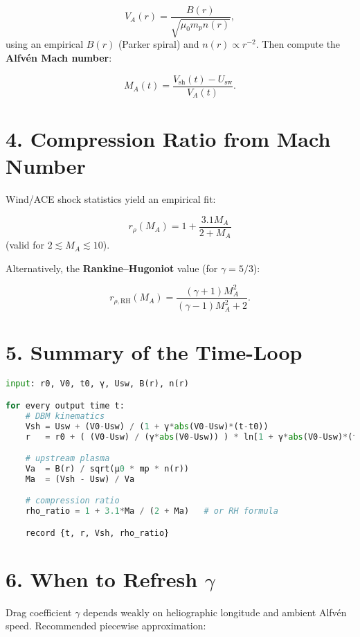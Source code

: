 \[
V_A(r) = \frac{B(r)}{\sqrt{\mu_0 m_p n(r)}},
\]
using an empirical $B(r)$ (Parker spiral) and $n(r) \propto r^{-2}$. Then compute the \textbf{Alfvén Mach number}:

\[
M_A(t) = \frac{V_{\text{sh}}(t) - U_{\text{sw}}}{V_A(t)}.
\]

\hrulefill

\section*{4. Compression Ratio from Mach Number}

Wind/ACE shock statistics yield an empirical fit:

\[
\boxed{
r_{\rho}(M_A) = 1 + \frac{3.1 M_A}{2 + M_A}
}
\]
(valid for $2 \lesssim M_A \lesssim 10$).

Alternatively, the \textbf{Rankine–Hugoniot} value (for $\gamma = 5/3$):

\[
r_{\rho, \mathrm{RH}}(M_A) = \frac{(\gamma + 1) M_A^2}{(\gamma - 1) M_A^2 + 2}.
\]

\hrulefill

\section*{5. Summary of the Time-Loop}

\begin{lstlisting}[language=Python]
input: r0, V0, t0, γ, Usw, B(r), n(r)

for every output time t:
    # DBM kinematics
    Vsh = Usw + (V0-Usw) / (1 + γ*abs(V0-Usw)*(t-t0))
    r   = r0 + ( (V0-Usw) / (γ*abs(V0-Usw)) ) * ln[1 + γ*abs(V0-Usw)*(t-t0) ] + Usw*(t-t0)

    # upstream plasma
    Va  = B(r) / sqrt(μ0 * mp * n(r))
    Ma  = (Vsh - Usw) / Va

    # compression ratio
    rho_ratio = 1 + 3.1*Ma / (2 + Ma)   # or RH formula

    record {t, r, Vsh, rho_ratio}
\end{lstlisting}

\hrulefill

\section*{6. When to Refresh $\gamma$}

Drag coefficient $\gamma$ depends weakly on heliographic longitude and ambient Alfvén speed. Recommended piecewise approximation:

